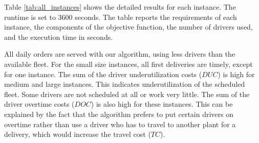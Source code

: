 \documentclass{article}
\begin{document}
\begin{table}[htb]
    \centering
    \caption{RMC delivered within different runtimes}
    \label{tab:runtime}
    \scriptsize
    
\end{table}


Table \ref*{tab:all_instances} shows the detailed results for each instance. The runtime is set to 3600 seconds. The table reports the requirements of each instance, the components of the objective function, the number of drivers used, and the execution time in seconds.

All daily orders are served with our algorithm, using less drivers than the available fleet. For the small size instances, all first deliveries are timely, except for one instance. The sum of the driver underutilization costs ($DUC$) is high for medium and large instances. This indicates underutilization of the scheduled fleet. Some drivers are not scheduled at all or work very little. The sum of the driver overtime costs ($DOC$) is also high for these instances. This can be explained by the fact that the algorithm prefers to put certain drivers on overtime rather than use a driver who has to travel to another plant for a delivery, which would increase the travel cost ($TC$).
\end{document}
